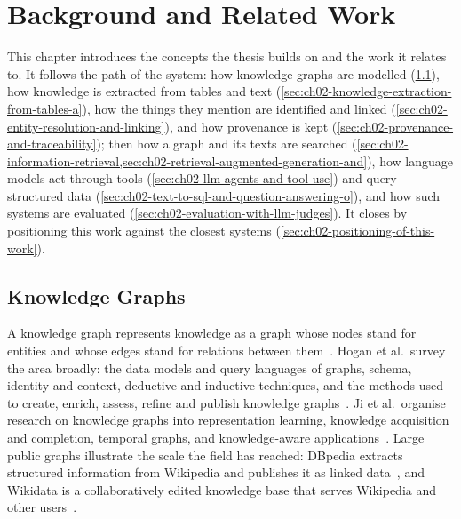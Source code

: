 \chapter{Background and Related Work}\label{ch02}

This chapter introduces the concepts the thesis builds on and the work it relates to. It follows the path of
the system: how knowledge graphs are modelled (\cref{sec:ch02-knowledge-graphs}), how knowledge is extracted
from tables and text (\cref{sec:ch02-knowledge-extraction-from-tables-a}), how the things they mention are
identified and linked (\cref{sec:ch02-entity-resolution-and-linking}), and how provenance is kept
(\cref{sec:ch02-provenance-and-traceability}); then how a graph and its texts are searched
(\cref{sec:ch02-information-retrieval,sec:ch02-retrieval-augmented-generation-and}), how language models act
through tools (\cref{sec:ch02-llm-agents-and-tool-use}) and query structured data
(\cref{sec:ch02-text-to-sql-and-question-answering-o}), and how such systems are evaluated
(\cref{sec:ch02-evaluation-with-llm-judges}). It closes by positioning this work against the closest systems
(\cref{sec:ch02-positioning-of-this-work}).

\section{Knowledge Graphs}\label{sec:ch02-knowledge-graphs}

A knowledge graph represents knowledge as a graph whose nodes stand for entities and whose edges stand for
relations between them~\cite{hogan2021knowledge}. Hogan et al.\ survey the area broadly: the data models and
query languages of graphs, schema, identity and context, deductive and inductive techniques, and the methods
used to create, enrich, assess, refine and publish knowledge graphs~\cite{hogan2021knowledge}. Ji et al.\
organise research on knowledge graphs into representation learning, knowledge acquisition and completion,
temporal graphs, and knowledge-aware applications~\cite{ji2022survey}. Large public graphs illustrate the
scale the field has reached: DBpedia extracts structured information from Wikipedia and publishes it as linked
data~\cite{auer2007dbpedia,lehmann2015dbpedia}, and Wikidata is a collaboratively edited knowledge base that
serves Wikipedia and other users~\cite{vrandecic2014wikidata}.

